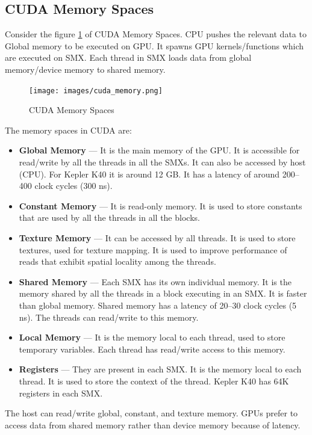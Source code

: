 \documentclass[12pt]{book}
\begin{document}
\subsection{CUDA Memory Spaces}
Consider the figure \ref{fig:cuda_memory} of CUDA Memory Spaces. CPU pushes the relevant data to Global memory to be executed on GPU.
It spawns GPU kernels/functions which are executed on SMX. Each thread in SMX loads data from global memory/device memory to shared memory.
\begin{figure}[H]
    \centering
    \texttt{[image: images/cuda\_memory.png]}
    \caption{CUDA Memory Spaces}
    \label{fig:cuda_memory}
\end{figure}
The memory spaces in CUDA are:
\begin{itemize}
    \item \textbf{Global Memory} — It is the main memory of the GPU. It is accessible for read/write by all the threads in all the SMXs. 
    It can also be accessed by host (CPU). For Kepler K40 it is around 12 GB. It has a latency of around 200–400 clock cycles (300 ns).
    
    \item \textbf{Constant Memory} — It is read-only memory. It is used to store constants that are used by all the threads in all the blocks.
    
    \item \textbf{Texture Memory} — It can be accessed by all threads. It is used to store textures, used for texture mapping. It is used to improve performance of reads that exhibit spatial locality among the threads.
    
    \item \textbf{Shared Memory} — Each SMX has its own individual memory. It is the memory shared by all the threads in a block executing in an SMX. It is faster than global memory. Shared memory has a latency of 20–30 clock cycles (5 ns). The threads can read/write to this memory.
    
    \item \textbf{Local Memory} — It is the memory local to each thread, used to store temporary variables. Each thread has read/write access to this memory.
    
    \item \textbf{Registers} — They are present in each SMX. It is the memory local to each thread. It is used to store the context of the thread. Kepler K40 has 64K registers in each SMX.
\end{itemize}
The host can read/write global, constant, and texture memory. GPUs prefer to access data from shared memory rather than device memory because of latency.
\end{document}
